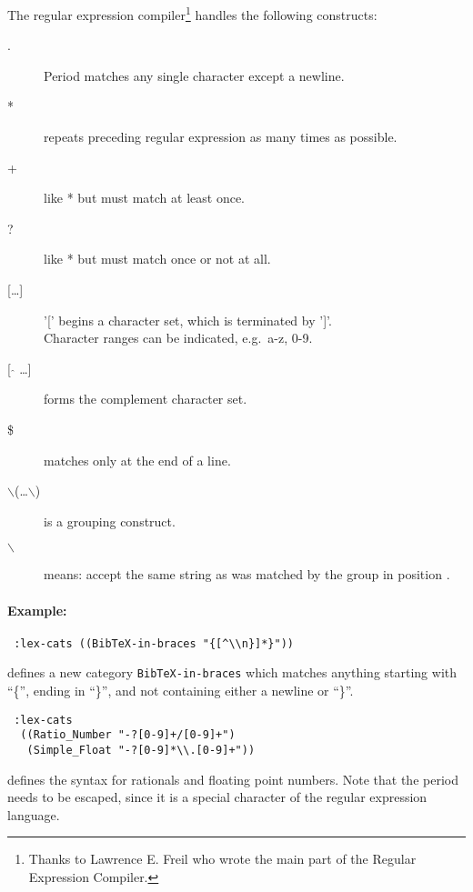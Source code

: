 The regular expression compiler\footnote{Thanks to Lawrence E. Freil
who wrote the main part of the Regular Expression Compiler.} handles the
following constructs:

\begin{description}

\item[.] Period matches any single character except a newline.
\item[*] repeats preceding regular expression as many times as possible.
\item[+] like * but must match at least once.
\item[?] like * but must match once or not at all.
\item[{[\ldots]}] '[' begins a character set, which is terminated by ']'.\\
              Character ranges can be indicated, e.g.\ a-z, 0-9.
\item[{[ $\hat{}$ \ldots]}] forms the complement character set.
\item[\$] matches only at the end of a line.
\item[$\backslash$(\ldots $\backslash$)] is a grouping construct.
\item[$\backslash$ ] means: accept the same string as was matched
        by the group in position .
\end{description}

\paragraph {Example:}

{\tt \begin{verbatim}
 :lex-cats ((BibTeX-in-braces "{[^\\n}]*}"))
 \end{verbatim}}

defines a new category {\tt BibTeX-in-braces} which matches anything
starting with ``\{'', ending in ``\}'', and not containing either a
newline or ``\}''.


{\tt \begin{verbatim}
 :lex-cats
  ((Ratio_Number "-?[0-9]+/[0-9]+")
   (Simple_Float "-?[0-9]*\\.[0-9]+"))
 \end{verbatim}}

defines the syntax for rationals and floating point numbers.  Note
that the period needs to be escaped, since it is a special character of
the regular expression language.

